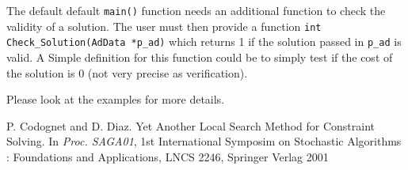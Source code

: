 \documentclass{article}
\begin{document}
The default default \texttt{main()} function needs an additional function to
check the validity of a solution. The user must then provide a function
\texttt{int Check\_Solution(AdData *p\_ad)} which returns 1 if the solution
passed in \texttt{p\_ad} is valid. A Simple definition for this function
could be to simply test if the cost of the solution is 0 (not very precise as
verification).

Please look at the examples for more details.



\begin{thebibliography}{99}

\newblock P. Codognet and D. Diaz.
\newblock Yet Another Local Search Method for Constraint Solving.
\newblock In {\em Proc. SAGA01}, 1st International Symposim on
Stochastic Algorithms : Foundations and Applications,
\newblock LNCS 2246, Springer Verlag 2001

\end{thebibliography}
\end{document}
